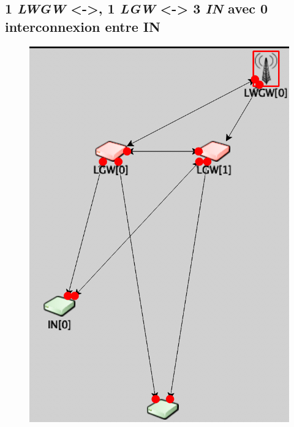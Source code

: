 \documentclass[a4paper]{article}
\begin{document}
\subsection{ 1 \textit{LWGW} <->, 1 \textit{LGW} <-> 3 \textit{IN} avec 0 interconnexion entre IN}
\begin{figure}[h!]
\centering
\includegraphics[scale=0.5]{cas_1.png} 
\end{figure}
\newpage
\end{document}
